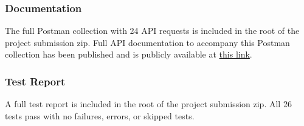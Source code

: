 \subsubsection{Documentation}

The full Postman collection with 24 API requests is included in the root of the project submission zip. Full API documentation to accompany this Postman collection has been published and is publicly available at \href{https://documenter.getpostman.com/view/25830847/2sA3BheZms}{this link}.

\subsubsection{Test Report}

A full test report is included in the root of the project submission zip. All 26 tests pass with no failures, errors, or skipped tests.